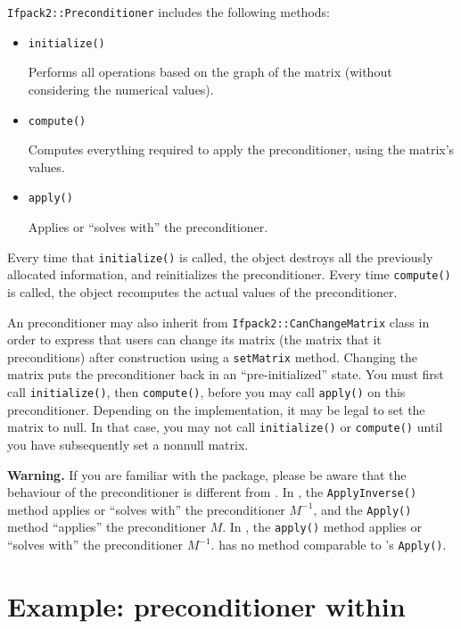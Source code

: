 \texttt{Ifpack2::Preconditioner} includes the following methods:
\begin{itemize}
  \item \texttt{initialize()}

    Performs all operations based on the graph of the matrix (without
    considering the numerical values).

  \item \texttt{compute()}

    Computes everything required to apply the preconditioner, using the matrix's
    values.

  \item \texttt{apply()}

    Applies or ``solves with'' the preconditioner.
\end{itemize}
Every time that \texttt{initialize()} is called, the object destroys all the
previously allocated information, and reinitializes the preconditioner. Every
time \texttt{compute()} is called, the object recomputes the actual values of the
preconditioner.

An \ifpacktwo preconditioner may also inherit from
\texttt{Ifpack2::CanChangeMatrix} class in order to express that users can
change its matrix (the matrix that it preconditions) after construction using a
\texttt{setMatrix} method.  Changing the matrix puts the preconditioner back in
an ``pre-initialized'' state.  You must first call \texttt{initialize()}, then
\texttt{compute()}, before you may call \texttt{apply()} on this preconditioner.
Depending on the implementation, it may be legal to set the matrix to null. In
that case, you may not call \texttt{initialize()} or \texttt{compute()} until
you have subsequently set a nonnull matrix.

\textbf{Warning.} If you are familiar with the \ifpack package, please be aware
that the behaviour of the \ifpacktwo preconditioner is different from \ifpack.
In \ifpack, the \texttt{ApplyInverse()} method applies or ``solves with'' the
preconditioner $M^{-1}$, and the \texttt{Apply()} method ``applies'' the
preconditioner $M$. In \ifpacktwo, the \texttt{apply()} method applies or
``solves with'' the preconditioner $M^{-1}$. \ifpacktwo has no method comparable
to \ifpack's \texttt{Apply()}.

\section{Example: \ifpacktwo preconditioner within \belos}\label{sec:examples in code}

